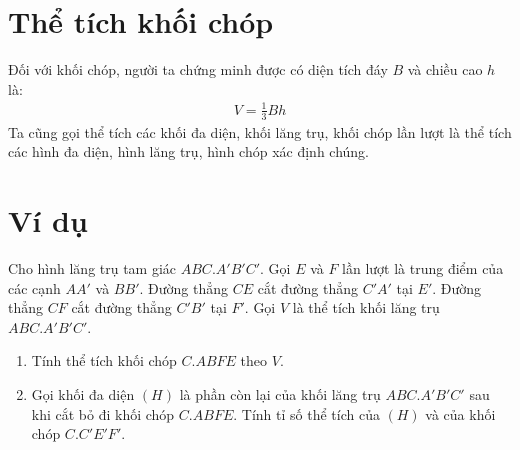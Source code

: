 \section{Thể tích khối chóp}
Đối với khối chóp, người ta chứng minh được  có diện tích đáy \( B \) và chiều cao \( h \) là:
\begin{eqnarray}
    V = \frac{1}{3} Bh
\end{eqnarray}
Ta cũng gọi thể tích các khối đa diện, khối lăng trụ, khối chóp lần lượt là thể tích các hình đa diện, hình lăng trụ, hình chóp xác định chúng.

\section*{Ví dụ}
Cho hình lăng trụ tam giác $ABC.A'B'C'$. Gọi $E$ và $F$ lần lượt là trung điểm của các cạnh $AA'$ và $BB'$. Đường thẳng $CE$ cắt đường thẳng $C'A'$ tại $E'$. Đường thẳng $CF$ cắt đường thẳng $C'B'$ tại $F'$. Gọi $V$ là thể tích khối lăng trụ $ABC.A'B'C'$.

\begin{enumerate}[label=(\alph*)]
    \item Tính thể tích khối chóp $C.ABFE$ theo $V$.
    \item Gọi khối đa diện $(H)$ là phần còn lại của khối lăng trụ $ABC.A'B'C'$ sau khi cắt bỏ đi khối chóp $C.ABFE$. Tính tỉ số thể tích của $(H)$ và của khối chóp $C.C'E'F'$.
\end{enumerate}

